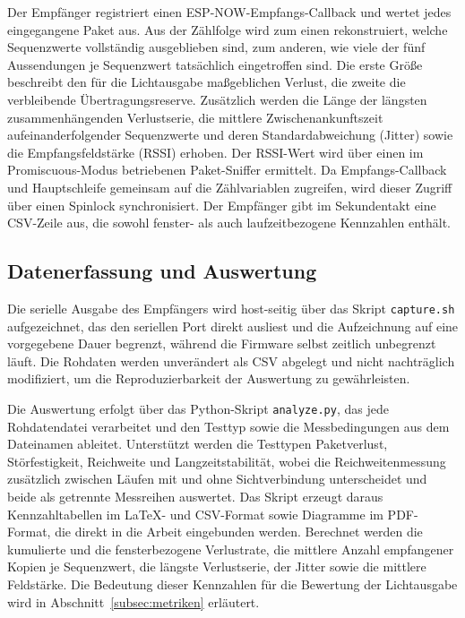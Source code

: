 Der Empfänger registriert einen ESP-NOW-Empfangs-Callback und wertet
jedes eingegangene Paket aus. Aus der Zählfolge wird zum einen
rekonstruiert, welche Sequenzwerte vollständig ausgeblieben sind, zum
anderen, wie viele der fünf Aussendungen je Sequenzwert tatsächlich
eingetroffen sind. Die erste Größe beschreibt den für die Lichtausgabe
maßgeblichen Verlust, die zweite die verbleibende Übertragungsreserve.
Zusätzlich werden die Länge der längsten zusammenhängenden Verlustserie,
die mittlere Zwischenankunftszeit aufeinanderfolgender Sequenzwerte und
deren Standardabweichung (Jitter) sowie die Empfangsfeldstärke (RSSI)
erhoben.
Der RSSI-Wert wird über einen im Promiscuous-Modus betriebenen
Paket-Sniffer ermittelt. Da Empfangs-Callback und Hauptschleife
gemeinsam auf die Zählvariablen zugreifen, wird dieser Zugriff über einen
Spinlock synchronisiert. Der Empfänger gibt im Sekundentakt eine
CSV-Zeile aus, die sowohl fenster- als auch laufzeitbezogene Kennzahlen
enthält.

\subsection{Datenerfassung und Auswertung}
\label{subsec:datenerfassung}

Die serielle Ausgabe des Empfängers wird host-seitig über das Skript
\texttt{capture.sh} aufgezeichnet, das den seriellen Port direkt ausliest
und die Aufzeichnung auf eine vorgegebene Dauer begrenzt, während die
Firmware selbst zeitlich unbegrenzt läuft. Die Rohdaten werden unverändert
als CSV abgelegt und nicht nachträglich modifiziert, um die
Reproduzierbarkeit der Auswertung zu gewährleisten.

Die Auswertung erfolgt über das Python-Skript \texttt{analyze.py}, das
jede Rohdatendatei verarbeitet und den Testtyp sowie die Messbedingungen
aus dem Dateinamen ableitet. Unterstützt werden die Testtypen
Paketverlust, Störfestigkeit, Reichweite und Langzeitstabilität, wobei
die Reichweitenmessung zusätzlich zwischen Läufen mit und ohne
Sichtverbindung unterscheidet und beide als getrennte Messreihen
auswertet. Das Skript erzeugt daraus Kennzahltabellen im \LaTeX- und
CSV-Format sowie Diagramme im PDF-Format, die direkt in die Arbeit
eingebunden werden. Berechnet werden die kumulierte und die
fensterbezogene Verlustrate, die mittlere Anzahl empfangener Kopien je
Sequenzwert, die längste Verlustserie, der Jitter sowie die mittlere
Feldstärke. Die Bedeutung dieser Kennzahlen für die Bewertung der
Lichtausgabe wird in Abschnitt~\ref{subsec:metriken} erläutert.

